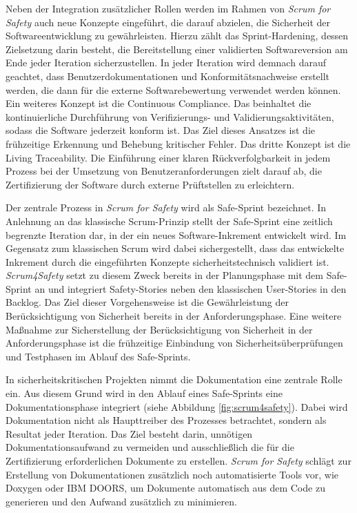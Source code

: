 \documentclass[acmtog]{acmart}
\begin{document}
Neben der Integration zusätzlicher Rollen werden im Rahmen von \textit{Scrum for Safety} auch neue Konzepte eingeführt, die darauf abzielen, die Sicherheit der Softwareentwicklung zu gewährleisten. 
Hierzu zählt das Sprint-Hardening, dessen Zielsetzung darin besteht, die Bereitstellung einer validierten Softwareversion am Ende jeder Iteration sicherzustellen. In jeder Iteration wird demnach darauf geachtet, 
dass Benutzerdokumentationen und Konformitätsnachweise erstellt werden, die dann für die externe Softwarebewertung verwendet werden können. \cite{barbareschi_scrum_2022}
Ein weiteres Konzept ist die Continuous Compliance. Das beinhaltet die kontinuierliche Durchführung von Verifizierungs- und Validierungsaktivitäten, sodass die Software jederzeit konform ist. 
Das Ziel dieses Ansatzes ist die frühzeitige Erkennung und Behebung kritischer Fehler. \cite{barbareschi_scrum_2022} Das dritte Konzept ist die Living Traceability.
Die Einführung einer klaren Rückverfolgbarkeit in jedem Prozess bei der Umsetzung von Benutzeranforderungen zielt darauf ab, die Zertifizierung der Software durch externe Prüftstellen zu erleichtern. \cite{barbareschi_scrum_2022}

Der zentrale Prozess in \textit{Scrum for Safety} wird als Safe-Sprint bezeichnet. In Anlehnung an das klassische Scrum-Prinzip stellt der Safe-Sprint eine zeitlich begrenzte Iteration dar, in der ein neues Software-Inkrement entwickelt wird. 
Im Gegensatz zum klassischen Scrum wird dabei sichergestellt, dass das entwickelte Inkrement durch die eingeführten Konzepte sicherheitstechnisch validiert ist. \cite{barbareschi_scrum_2022}
\textit{Scrum4Safety} setzt zu diesem Zweck bereits in der Planungsphase mit dem Safe-Sprint an und integriert Safety-Stories neben den klassischen User-Stories in den Backlog.
Das Ziel dieser Vorgehensweise ist die Gewährleistung der Berücksichtigung von Sicherheit bereits in der Anforderungsphase. 
Eine weitere Maßnahme zur Sicherstellung der Berücksichtigung von Sicherheit in der Anforderungsphase ist die frühzeitige Einbindung von Sicherheitsüberprüfungen und Testphasen im Ablauf des Safe-Sprints. \cite{barbareschi_scrum_2022}

In sicherheitskritischen Projekten nimmt die Dokumentation eine zentrale Rolle ein. Aus diesem Grund wird in den Ablauf eines Safe-Sprints eine Dokumentationsphase integriert (siehe Abbildung \ref{fig:scrum4safety}). 
Dabei wird Dokumentation nicht als Haupttreiber des Prozesses betrachtet, sondern als Resultat jeder Iteration. \cite{barbareschi_scrum_2022}
Das Ziel besteht darin, unnötigen Dokumentationsaufwand zu vermeiden und ausschließlich die für die Zertifizierung erforderlichen Dokumente zu erstellen. 
\textit{Scrum for Safety} schlägt zur Erstellung von Dokumentationen zusätzlich noch automatisierte Tools vor, wie Doxygen oder IBM DOORS, um Dokumente automatisch aus dem Code zu generieren und den Aufwand zusätzlich zu minimieren. \cite{barbareschi_scrum_2022}
\end{document}
